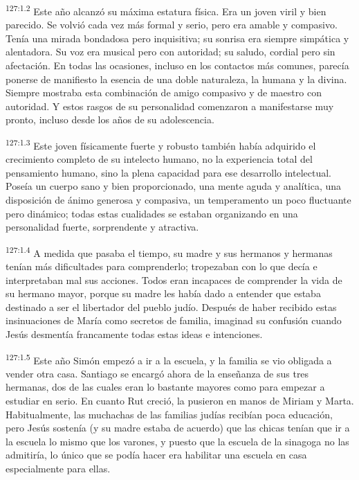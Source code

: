 \par
\textsuperscript{127:1.2} Este año alcanzó su máxima estatura física. Era un joven viril y bien parecido. Se volvió cada vez más formal y serio, pero era amable y compasivo. Tenía una mirada bondadosa pero inquisitiva; su sonrisa era siempre simpática y alentadora. Su voz era musical pero con autoridad; su saludo, cordial pero sin afectación. En todas las ocasiones, incluso en los contactos más comunes, parecía ponerse de manifiesto la esencia de una doble naturaleza, la humana y la divina. Siempre mostraba esta combinación de amigo compasivo y de maestro con autoridad. Y estos rasgos de su personalidad comenzaron a manifestarse muy pronto, incluso desde los años de su adolescencia.

\par
\textsuperscript{127:1.3} Este joven físicamente fuerte y robusto también había adquirido el crecimiento completo de su intelecto humano, no la experiencia total del pensamiento humano, sino la plena capacidad para ese desarrollo intelectual. Poseía un cuerpo sano y bien proporcionado, una mente aguda y analítica, una disposición de ánimo generosa y compasiva, un temperamento un poco fluctuante pero dinámico; todas estas cualidades se estaban organizando en una personalidad fuerte, sorprendente y atractiva.

\par
\textsuperscript{127:1.4} A medida que pasaba el tiempo, su madre y sus hermanos y hermanas tenían más dificultades para comprenderlo; tropezaban con lo que decía e interpretaban mal sus acciones. Todos eran incapaces de comprender la vida de su hermano mayor, porque su madre les había dado a entender que estaba destinado a ser el libertador del pueblo judío. Después de haber recibido estas insinuaciones de María como secretos de familia, imaginad su confusión cuando Jesús desmentía francamente todas estas ideas e intenciones.

\par
\textsuperscript{127:1.5} Este año Simón empezó a ir a la escuela, y la familia se vio obligada a vender otra casa. Santiago se encargó ahora de la enseñanza de sus tres hermanas, dos de las cuales eran lo bastante mayores como para empezar a estudiar en serio. En cuanto Rut creció, la pusieron en manos de Miriam y Marta. Habitualmente, las muchachas de las familias judías recibían poca educación, pero Jesús sostenía (y su madre estaba de acuerdo) que las chicas tenían que ir a la escuela lo mismo que los varones, y puesto que la escuela de la sinagoga no las admitiría, lo único que se podía hacer era habilitar una escuela en casa especialmente para ellas.

